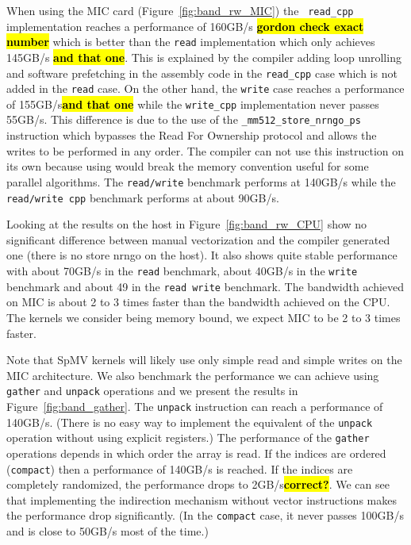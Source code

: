 \documentclass[10pt,conference,compsocconf]{IEEEtran}
\newcommand{\todo}[1]{{\color{red}\textbf{\hl{#1}}\xspace}}
\begin{document}
When using the MIC card (Figure~\ref{fig:band_rw_MIC}) the {\tt
  read\_cpp} implementation reaches a performance of 160GB/s
\todo{gordon check exact number} which is better than the {\tt read}
implementation which only achieves 145GB/s \todo{and that one}. This
is explained by the compiler adding loop unrolling and software
prefetching in the assembly code in the {\tt read\_cpp} case which is
not added in the {\tt read} case. On the other hand, the {\tt write}
case reaches a performance of 155GB/s\todo{and that one} while the
{\tt write\_cpp} implementation never passes 55GB/s. This difference
is due to the use of the {\tt \_mm512\_store\_nrngo\_ps} instruction
which bypasses the Read For Ownership protocol and allows the writes
to be performed in any order. The compiler can not use this
instruction on its own because using would break the memory convention
useful for some parallel algorithms. The {\tt read/write} benchmark
performs at 140GB/s while the {\tt read/write cpp} benchmark performs
at about 90GB/s.

Looking at the results on the host in Figure~\ref{fig:band_rw_CPU}
show no significant difference between manual vectorization and the
compiler generated one (there is no store nrngo on the host). It also
shows quite stable performance with about 70GB/s in the {\tt read}
benchmark, about 40GB/s in the {\tt write} benchmark and about 49 in
the {\tt read write} benchmark. The bandwidth achieved on MIC is about
2 to 3 times faster than the bandwidth achieved on the CPU. The
kernels we consider being memory bound, we expect MIC to be 2 to 3
times faster.

Note that SpMV kernels will likely use only simple read and simple
writes on the MIC architecture. We also benchmark the performance we
can achieve using {\tt gather} and {\tt unpack} operations and we
present the results in Figure~\ref{fig:band_gather}. The {\tt unpack}
instruction can reach a performance of 140GB/s. (There is no easy way
to implement the equivalent of the {\tt unpack} operation without
using explicit registers.) The performance of the {\tt gather}
operations depends in which order the array is read. If the indices
are ordered ({\tt compact}) then a performance of 140GB/s is
reached. If the indices are completely randomized, the performance
drops to 2GB/s\todo{correct?}. We can see that implementing the
indirection mechanism without vector instructions makes the
performance drop significantly. (In the {\tt compact} case, it never
passes 100GB/s and is close to 50GB/s most of the time.)
\end{document}
